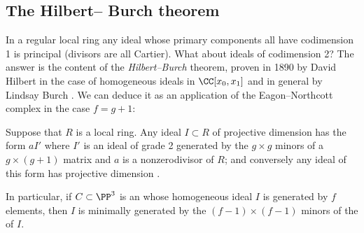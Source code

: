 \subsection*{The Hilbert--\kern-0.5pt Burch theorem}

\hskip-3pt
In a regular local ring any ideal whose primary components all have 
\null codimension\kern1.5pt 1 is 
principal (divisors are all Cartier). What about
ideals of codimension 2? The answer is the content of the
\emph{Hilbert--Burch} theorem, proven
in 1890 by David Hilbert in the case of homogeneous ideals in
%
%
$\CC[x_{0},x_{1}]$ and in general by
Lindsay Burch \citeyear{MR212008}. We can deduce it as an application of
the Eagon--Northcott complex
in the case $f =g+1$:

\begin{corollary}\label{Hilbert--Burch}
Suppose that $R$ is a local ring. Any ideal $I\subset R$ of projective
%
dimension \1 has the form
$aI'$ where $I'$ is an ideal of grade 2 generated by the $g\times g$
minors
of a $g \times (g+1)$ matrix and $a$ is a nonzerodivisor of $R$; and
conversely any ideal of this form
has projective dimension \1.

In particular, if $C\subset \PP^{3}$ is an 
%
whose homogeneous
ideal $I$ is generated by
$f$ elements, then $I$ is minimally generated by the $(f-1)\times (f-1)$
minors of the 
%
 of $I$.
\unif
\end{corollary}

